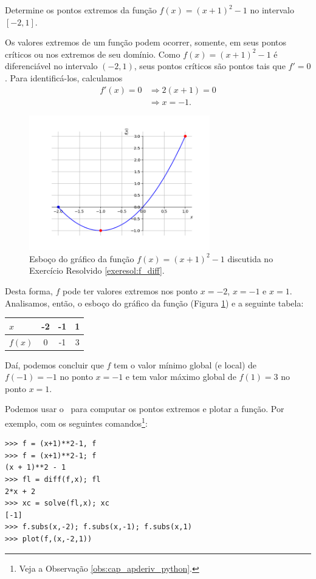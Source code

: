 \begin{exeresol}\label{exeresol:f_diff}
  Determine os pontos extremos da função $f(x) = (x+1)^2-1$ no intervalo $[-2,1]$.
\end{exeresol}
\begin{resol}
  Os valores extremos de um função podem ocorrer, somente, em seus pontos críticos ou nos extremos de seu domínio. Como $f(x) = (x+1)^2-1$ é diferenciável no intervalo $(-2,1)$, seus pontos críticos são pontos tais que $f'=0$. Para identificá-los, calculamos
  \begin{align}
    f'(x)=0 &\Rightarrow 2(x+1) = 0\\
            &\Rightarrow x = -1.
  \end{align}

  \begin{figure}[H]
    \centering
    \includegraphics[width=0.7\textwidth]{./cap_apderiv/dados/fig_exeresol_f_diff/fig_exeresol_f_diff}
    \caption{Esboço do gráfico da função $f(x) = (x+1)^2-1$ discutida no Exercício Resolvido \ref{exeresol:f_diff}.}
    \label{fig:exeresol_f_diff}
  \end{figure}

  Desta forma, $f$ pode ter valores extremos nos ponto $x=-2$, $x=-1$ e $x=1$. Analisamos, então, o esboço do gráfico da função (Figura \ref{fig:exeresol_f_diff}) e a seguinte tabela:\\
  \begin{center}
  \begin{tabular}[H]{l|ccc}
    $x$ & -2 & -1 & 1 \\\hline
    $f(x)$ & 0 & -1 & 3\\\hline
  \end{tabular}
\end{center}
Daí, podemos concluir que $f$ tem o valor mínimo global (e local) de $f(-1)=-1$ no ponto $x=-1$ e tem valor máximo global de $f(1)=3$ no ponto $x=1$.

\ifispython
Podemos usar o \sympy~para computar os pontos extremos e plotar a função. Por exemplo, com os seguintes comandos\footnote{Veja a Observação \ref{obs:cap_apderiv_python}.}:
\begin{verbatim}
>>> f = (x+1)**2-1, f
>>> f = (x+1)**2-1; f
(x + 1)**2 - 1
>>> fl = diff(f,x); fl
2*x + 2
>>> xc = solve(fl,x); xc
[-1]
>>> f.subs(x,-2); f.subs(x,-1); f.subs(x,1)
>>> plot(f,(x,-2,1))
\end{verbatim}
\fi
\end{resol}

